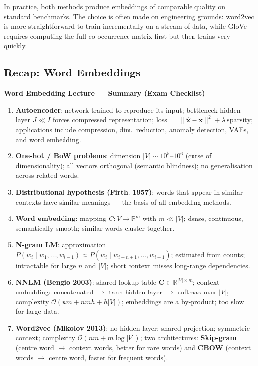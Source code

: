 \documentclass[11pt,a4paper]{article}
\begin{document}
In practice, both methods produce embeddings of comparable quality on standard benchmarks. The choice is often made on engineering grounds: word2vec is more straightforward to train incrementally on a stream of data, while GloVe requires computing the full co-occurrence matrix first but then trains very quickly.

\subsection{Recap: Word Embeddings}
\label{sec:recap_we}

\begin{tcolorbox}[colback=WarningRedBg,colframe=WarningRed,boxrule=0.8pt,arc=3pt]
\textbf{Word Embedding Lecture — Summary (Exam Checklist)}
\begin{enumerate}
  \item \textbf{Autoencoder}: network trained to reproduce its input; bottleneck hidden layer $J \ll I$ forces compressed representation; loss $= \|\hat{\mathbf{x}} - \mathbf{x}\|^2 + \lambda\,\text{sparsity}$; applications include compression, dim.\ reduction, anomaly detection, VAEs, and word embedding.
  \item \textbf{One-hot / BoW problems}: dimension $|V| \sim 10^5$--$10^6$ (curse of dimensionality); all vectors orthogonal (semantic blindness); no generalisation across related words.
  \item \textbf{Distributional hypothesis (Firth, 1957)}: words that appear in similar contexts have similar meanings — the basis of all embedding methods.
  \item \textbf{Word embedding}: mapping $C: V \to \mathbb{R}^m$ with $m \ll |V|$; dense, continuous, semantically smooth; similar words cluster together.
  \item \textbf{N-gram LM}: approximation $P(w_i \mid w_1,\ldots,w_{i-1}) \approx P(w_i \mid w_{i-n+1},\ldots,w_{i-1})$; estimated from counts; intractable for large $n$ and $|V|$; short context misses long-range dependencies.
  \item \textbf{NNLM (Bengio 2003)}: shared lookup table $\mathbf{C} \in \mathbb{R}^{|V|\times m}$; context embeddings concatenated $\to$ tanh hidden layer $\to$ softmax over $|V|$; complexity $\mathcal{O}(nm + nmh + h|V|)$; embeddings are a by-product; too slow for large data.
  \item \textbf{Word2vec (Mikolov 2013)}: no hidden layer; shared projection; symmetric context; complexity $\mathcal{O}(nm + m\log|V|)$; two architectures: \textbf{Skip-gram} (centre word $\to$ context words, better for rare words) and \textbf{CBOW} (context words $\to$ centre word, faster for frequent words).

\end{enumerate}
\end{tcolorbox}
\end{document}
